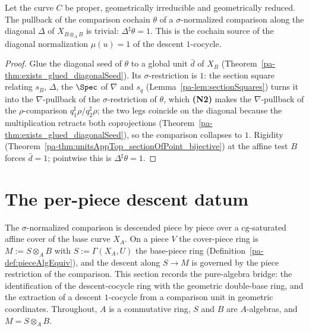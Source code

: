 \begin{theorem}
  \label{pa-thm:normalizedComparison_diagonal_eq_one}
  \leanok

  Let the curve \(C\) be proper, geometrically irreducible and geometrically reduced. The pullback
  of the comparison cochain \(\theta\) of a \(\sigma\)-normalized comparison along the diagonal
  \(\Delta\) of \(X_{B \otimes_A B}\) is trivial: \(\Delta^{\sharp}\theta = 1\). This is the
  cochain source of the diagonal normalization \(\mu(u) = 1\) of the descent \(1\)-cocycle.
\end{theorem}
\begin{proof}
  \leanok
  Glue the diagonal seed of \(\theta\) to a global unit \(\bar d\) of \(X_B\)
  (Theorem~\ref{pa-thm:exists_glued_diagonalSeed}). Its \(\sigma\)-restriction is \(1\): the section
  square relating \(s_B\), \(\Delta\), the \(\Spec\) of \(\nabla\) and \(s_q\)
  (Lemma~\ref{pa-lem:sectionSquares}) turns it into the \(\nabla\)-pullback of the
  \(\sigma\)-restriction of \(\theta\), which \textbf{(N2)} makes the \(\nabla\)-pullback of the
  \(\rho\)-comparison \(q_1^{\sharp}\rho / q_2^{\sharp}\rho\); the two legs coincide on the diagonal
  because the multiplication retracts both coprojections
  (Theorem~\ref{pa-thm:exists_glued_diagonalSeed}), so the comparison collapses to \(1\). Rigidity
  (Theorem~\ref{pa-thm:unitsAppTop_sectionOfPoint_bijective}) at the affine test \(B\) forces \(\bar d
  = 1\); pointwise this is \(\Delta^{\sharp}\theta = 1\).
\end{proof}

\section{The per-piece descent datum}
\label{pa-sec:effectivityDescentDatum}

The \(\sigma\)-normalized comparison is descended piece by piece over a \(\mathrm{cg}\)-saturated
affine cover of the base curve \(X_A\). On a piece \(V\) the cover-piece ring is \(M := S \otimes_A
B\) with \(S := \Gamma(X_A, U)\) the base-piece ring (Definition~\ref{pa-def:pieceAlgEquiv}), and the
descent along \(S \to M\) is governed by the piece restriction of the comparison. This section
records the pure-algebra bridge: the identification of the descent-cocycle ring with the geometric
double-base ring, and the extraction of a descent \(1\)-cocycle from a comparison unit in geometric
coordinates. Throughout, \(A\) is a commutative ring, \(S\) and \(B\) are \(A\)-algebras, and \(M =
S \otimes_A B\).

